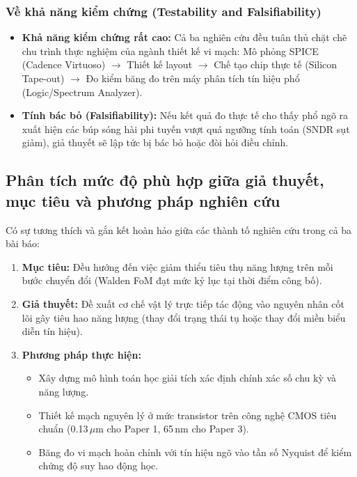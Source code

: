 \documentclass[12pt,a4paper]{article}
\begin{document}
\subsubsection{Về khả năng kiểm chứng (Testability and Falsifiability)}
\begin{itemize}
    \item \textbf{Khả năng kiểm chứng rất cao:} Cả ba nghiên cứu đều tuân thủ chặt chẽ chu trình thực nghiệm của ngành thiết kế vi mạch: Mô phỏng SPICE (Cadence Virtuoso) $\rightarrow$ Thiết kế layout $\rightarrow$ Chế tạo chip thực tế (Silicon Tape-out) $\rightarrow$ Đo kiểm băng đo trên máy phân tích tín hiệu phổ (Logic/Spectrum Analyzer).
    \item \textbf{Tính bác bỏ (Falsifiability):} Nếu kết quả đo thực tế cho thấy phổ ngõ ra xuất hiện các búp sóng hài phi tuyến vượt quá ngưỡng tính toán (SNDR sụt giảm), giả thuyết sẽ lập tức bị bác bỏ hoặc đòi hỏi điều chỉnh.
\end{itemize}

\subsection{Phân tích mức độ phù hợp giữa giả thuyết, mục tiêu và phương pháp nghiên cứu}
Có sự tương thích và gắn kết hoàn hảo giữa các thành tố nghiên cứu trong cả ba bài báo:
\begin{enumerate}
    \item \textbf{Mục tiêu:} Đều hướng đến việc giảm thiểu tiêu thụ năng lượng trên mỗi bước chuyển đổi (Walden FoM đạt mức kỷ lục tại thời điểm công bố).
    \item \textbf{Giả thuyết:} Đề xuất cơ chế vật lý trực tiếp tác động vào nguyên nhân cốt lõi gây tiêu hao năng lượng (thay đổi trạng thái tụ hoặc thay đổi miền biểu diễn tín hiệu).
    \item \textbf{Phương pháp thực hiện:}
    \begin{itemize}
        \item Xây dựng mô hình toán học giải tích xác định chính xác số chu kỳ và năng lượng.
        \item Thiết kế mạch nguyên lý ở mức transistor trên công nghệ CMOS tiêu chuẩn (0.13\,$\mu$m cho Paper 1, 65\,nm cho Paper 3).
        \item Băng đo vi mạch hoàn chỉnh với tín hiệu ngõ vào tần số Nyquist để kiểm chứng độ suy hao động học.
    \end{itemize}
\end{enumerate}
\end{document}
